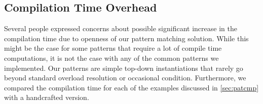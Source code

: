 \subsection{Compilation Time Overhead}
\label{sec:ctcmp}

Several people expressed concerns about possible significant increase in 
the compilation time due to openness of our pattern matching solution. While this 
might be the case for some patterns that require a lot of compile time 
computations, it is not the case with any of the common patterns we implemented. Our patterns are 
simple top-down instantiations that rarely go beyond standard overload 
resolution or occasional  condition. Furthermore, we compared the compilation 
time for each of the examples discussed in \textsection\ref{sec:patcmp}
with a handcrafted version.

